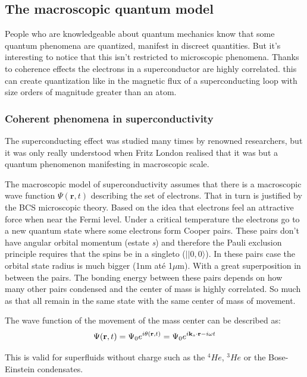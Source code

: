 \documentclass[12pt]{article}
\numberwithin{equation}{subsection}
\newcommand\page[1]{
{
}
}
\begin{document}
\subsection{The macroscopic quantum model}
\page{3,4 e 5}

People who are knowledgeable about quantum mechanics know that some quantum phenomena are quantized, manifest in discreet quantities. But it's interesting to notice that this isn't restricted to microscopic phenomena. Thanks to coherence effects the electrons in a superconductor are highly correlated. this can create quantization like in the magnetic flux of a superconducting loop with size orders of magnitude greater than an atom.



\subsubsection{Coherent phenomena in superconductivity}
The superconducting effect was studied many times by renowned researchers, but it was only really understood when Fritz London realised that it was but a quantum phenomenon manifesting in macroscopic scale. 

The macroscopic model of superconductivity assumes that there is a macroscopic wave function $\Psi(\textbf{r},t)$ describing the set of electrons. That in turn is justified by the BCS microscopic theory. Based on the idea that electrons feel an attractive force when near the Fermi level. Under a critical temperature the electrons go to a new quantum state where some electrons form Cooper pairs. These pairs don't have angular orbital momentum (estate \emph{s}) and therefore the Pauli exclusion principle requires that the spins be in a singleto ($||0,0\rangle$). In these pairs case the orbital state radius is much bigger (1nm até 1$\mu$m). With a great superposition in between the pairs. The bonding energy between these pairs depends on how many other pairs condensed and the center of mass is highly correlated. So much as that all remain in the same state with the same center of mass of movement.


The wave function of the movement of the mass center can be described as:
\begin{equation}
\Psi (\textbf{r} ,t)= \Psi_0 e^{i\theta(\textbf r,t)}= \Psi_0 e^{i\textbf{k}_s\cdot \textbf{r}-i\omega t } 
\end{equation}

This is valid for superfluids without charge such as the $^4He$, $^3He$ or the Bose-Einstein condensates.
\end{document}

